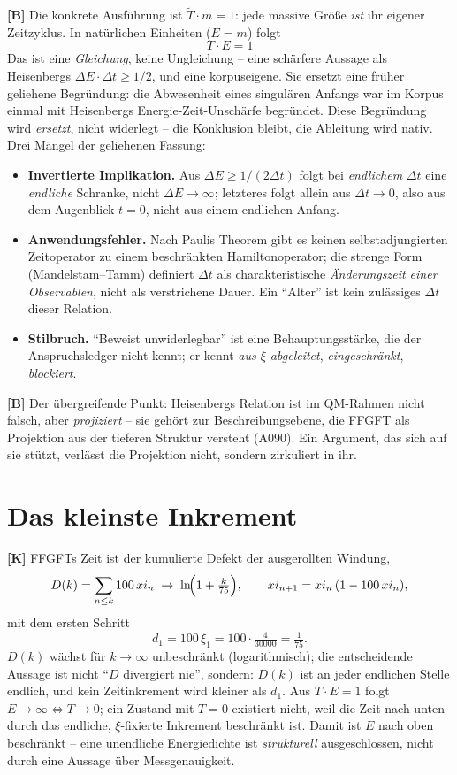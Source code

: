 \textbf{[B]} Die konkrete Ausführung ist $\tilde T\cdot m = 1$: jede massive Größe
\emph{ist} ihr eigener Zeitzyklus. In natürlichen Einheiten ($E=m$) folgt
\[
  \boxed{\;T\cdot E = 1\;}
\]
Das ist eine \emph{Gleichung}, keine Ungleichung -- eine schärfere Aussage als
Heisenbergs $\Delta E\cdot\Delta t\ge 1/2$, und eine korpuseigene. Sie ersetzt
eine früher geliehene Begründung: die Abwesenheit eines singulären Anfangs war im
Korpus einmal mit Heisenbergs Energie-Zeit-Unschärfe begründet. Diese Begründung
wird \emph{ersetzt}, nicht widerlegt -- die Konklusion bleibt, die Ableitung wird
nativ. Drei Mängel der geliehenen Fassung:

\begin{itemize}[leftmargin=2em,itemsep=3pt,topsep=3pt]
  \item \textbf{Invertierte Implikation.} Aus $\Delta E\ge 1/(2\Delta t)$ folgt
    bei \emph{endlichem} $\Delta t$ eine \emph{endliche} Schranke, nicht
    $\Delta E\to\infty$; letzteres folgt allein aus $\Delta t\to0$, also aus dem
    Augenblick $t=0$, nicht aus einem endlichen Anfang.
  \item \textbf{Anwendungsfehler.} Nach Paulis Theorem gibt es keinen
    selbstadjungierten Zeitoperator zu einem beschränkten Hamiltonoperator; die
    strenge Form (Mandelstam--Tamm) definiert $\Delta t$ als charakteristische
    \emph{Änderungszeit einer Observablen}, nicht als verstrichene Dauer. Ein
    \enquote{Alter} ist kein zulässiges $\Delta t$ dieser Relation.
  \item \textbf{Stilbruch.} \enquote{Beweist unwiderlegbar} ist eine
    Behauptungsstärke, die der Anspruchsledger nicht kennt; er kennt \emph{aus
    $\xi$ abgeleitet}, \emph{eingeschränkt}, \emph{blockiert}.
\end{itemize}

\textbf{[B]} Der übergreifende Punkt: Heisenbergs Relation ist im QM-Rahmen nicht
falsch, aber \emph{projiziert} -- sie gehört zur Beschreibungsebene, die FFGFT als
Projektion aus der tieferen Struktur versteht (A090). Ein Argument, das sich auf
sie stützt, verlässt die Projektion nicht, sondern zirkuliert in ihr.

\section{Das kleinste Inkrement}

\textbf{[K]} FFGFTs Zeit ist der kumulierte Defekt der ausgerollten Windung,
\[
  D(k) = \sum_{n\le k} 100\,\xi_n \;\to\; \ln\!\Bigl(1+\tfrac{k}{75}\Bigr),
  \qquad \xi_{n+1} = \xi_n\,(1-100\,\xi_n),
\]
mit dem ersten Schritt
\[
  d_1 = 100\,\xi_1 = 100\cdot\tfrac{4}{30000} = \tfrac{1}{75}.
\]
$D(k)$ wächst für $k\to\infty$ unbeschränkt (logarithmisch); die entscheidende
Aussage ist nicht \enquote{$D$ divergiert nie}, sondern: $D(k)$ ist an jeder
endlichen Stelle endlich, und kein Zeitinkrement wird kleiner als $d_1$. Aus
$T\cdot E=1$ folgt $E\to\infty\Leftrightarrow T\to0$; ein Zustand mit $T=0$
existiert nicht, weil die Zeit nach unten durch das endliche, $\xi$-fixierte
Inkrement beschränkt ist. Damit ist $E$ nach oben beschränkt -- eine unendliche
Energiedichte ist \emph{strukturell} ausgeschlossen, nicht durch eine Aussage über
Messgenauigkeit.

